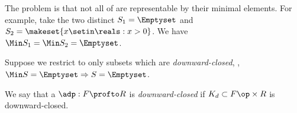The problem is that not all  of \posA are representable by their minimal elements.
For example, take the two distinct  $S_1 = \Emptyset$ and $S_2 = \makeset{x \setin \reals : x > 0}$.
We have $\Min S_1 = \Min S_2 = \Emptyset$.

Suppose we restrict to only subsets which are \emph{downward-closed}, \ie, $\Min S = \Emptyset \Rightarrow S = \Emptyset$.





We say that a  $\adp : F \profto R$ is \emph{downward-closed} if $K_d \subset F\op \times R$ is downward-closed.


